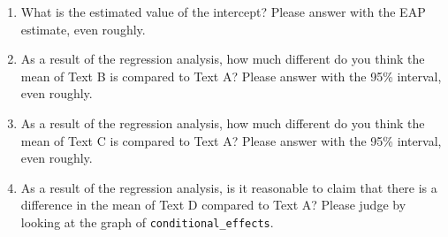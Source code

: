 \begin{enumerate}
	\item What is the estimated value of the intercept? Please answer with the EAP estimate, even roughly.
	\item As a result of the regression analysis, how much different do you think the mean of Text B is compared to Text A? Please answer with the 95\% interval, even roughly.
	\item As a result of the regression analysis, how much different do you think the mean of Text C is compared to Text A? Please answer with the 95\% interval, even roughly.
	\item As a result of the regression analysis, is it reasonable to claim that there is a difference in the mean of Text D compared to Text A? Please judge by looking at the graph of \verb|conditional_effects|.
\end{enumerate}
